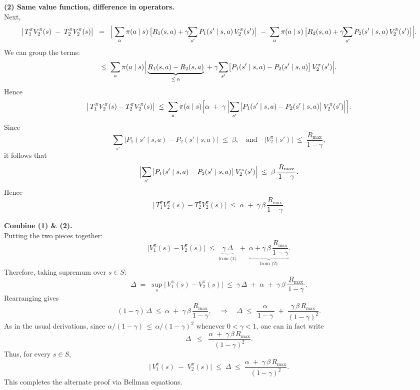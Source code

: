 \smallskip
\noindent
\textbf{(2) Same value function, difference in operators.}\\
Next,
\[
  \bigl|\,T_1^\pi V_2^\pi(s) \;-\;T_2^\pi V_2^\pi(s)\bigr|
  \;\;=\;\;
  \Bigl|\;
  \sum_{a}\pi(a\mid s)\,\bigl[R_1(s,a)+\gamma\!\!\sum_{s'}P_1(s'\mid s,a)\,V_2^\pi(s')\bigr]
  \;-\;
  \sum_{a}\pi(a\mid s)\,\bigl[R_2(s,a)+\gamma\!\!\sum_{s'}P_2(s'\mid s,a)\,V_2^\pi(s')\bigr]
  \Bigr|.
\]
We can group the terms:
\[
  \le\;
  \sum_{a}\pi(a\mid s)
  \Bigl|\,
    \underbrace{R_1(s,a)-R_2(s,a)}_{\le\,\alpha}
    \;+\;
    \gamma\!\sum_{s'}\bigl[P_1(s'\mid s,a)-P_2(s'\mid s,a)\bigr]\,V_2^\pi(s')
  \Bigr|.
\]
Hence
\[
  \bigl|\,T_1^\pi V_2^\pi(s) - T_2^\pi V_2^\pi(s)\bigr|
  \;\le\;
  \sum_{a}\pi(a\mid s)\Bigl[
    \alpha
    \;+\;
    \gamma\,\Bigl|\sum_{s'}\bigl[P_1(s'\mid s,a)-P_2(s'\mid s,a)\bigr]\,
         V_2^\pi(s')\Bigr|
  \Bigr].
\]
Since 
\[
  \sum_{s'} \bigl|P_1(s'\mid s,a)-P_2(s'\mid s,a)\bigr|
  \;\le\;
  \beta,
  \quad\text{and}\quad
  \bigl|V_2^\pi(s')\bigr|\;\le\;\frac{R_{\max}}{1-\gamma},
\]
it follows that
\[
  \Bigl|\sum_{s'}\bigl[P_1(s'\mid s,a)-P_2(s'\mid s,a)\bigr]\,
        V_2^\pi(s')
  \Bigr|
  \;\le\;
  \beta\,\frac{R_{\max}}{\,1-\gamma\,}.
\]
Hence
\[
  \bigl|\,T_1^\pi V_2^\pi(s) - T_2^\pi V_2^\pi(s)\bigr|
  \;\le\;
  \alpha \;+\;\gamma\,\beta\,\frac{R_{\max}}{1-\gamma}.
\]

\medskip
\noindent
\textbf{Combine (1) \& (2).}\\
Putting the two pieces together:
\[
  \bigl|V_1^\pi(s)-V_2^\pi(s)\bigr|
  \;\le\;
  \underbrace{\gamma\,\Delta}_{\text{from (1)}}
  \;+\;\underbrace{\alpha + \gamma\,\beta\,\frac{R_{\max}}{1-\gamma}}_{\text{from (2)}}.
\]
Therefore, taking supremum over $s\in S$:
\[
  \Delta 
  \;=\;
  \sup_{s}\bigl|\,V_1^\pi(s)-V_2^\pi(s)\bigr|
  \;\le\;
  \gamma\,\Delta \;+\; \alpha 
  \;+\;\gamma\,\beta\,\frac{R_{\max}}{\,1-\gamma\,}.
\]
Rearranging gives
\[
  (1-\gamma)\,\Delta 
  \;\le\;
  \alpha \;+\;\gamma\,\beta\,\frac{R_{\max}}{1-\gamma},
  \quad\Longrightarrow\quad
  \Delta
  \;\le\;
  \frac{\alpha}{\,1-\gamma\,}
  \;+\;
  \frac{\gamma\,\beta\,R_{\max}}{(1-\gamma)^2}.
\]
As in the usual derivations, since $\alpha/(1-\gamma)\,\le\,\alpha/(1-\gamma)^2$
whenever $0<\gamma<1$, one can in fact write
\[
  \Delta 
  \;\;\le\;\;  
  \frac{\alpha \;+\; \gamma\,\beta\,R_{\max}}{(1-\gamma)^2}.
\]
Thus, for every $s\in S$,
\[
  \bigl|\,V_1^\pi(s)\;-\;V_2^\pi(s)\bigr|
  \;\le\;
  \Delta
  \;\le\;
  \frac{\alpha \;+\;\gamma\,\beta\,R_{\max}}{(1-\gamma)^2}.
\]
This completes the alternate proof via Bellman equations.